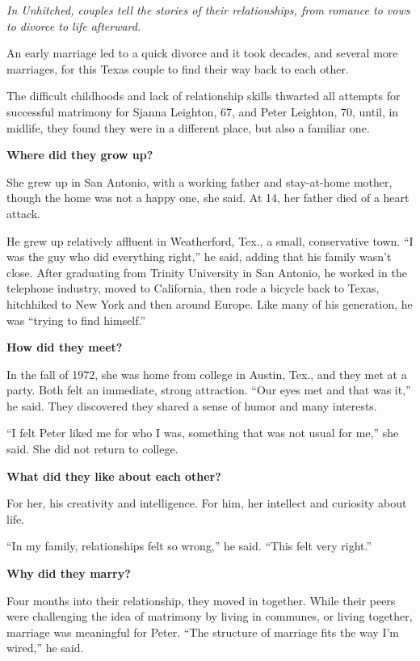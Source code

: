 \emph{In Unhitched, couples tell the stories of their relationships,
from romance to vows to divorce to life afterward.}

An early marriage led to a quick divorce and it took decades, and
several more marriages, for this Texas couple to find their way back to
each other.

The difficult childhoods and lack of relationship skills thwarted all
attempts for successful matrimony for Sjanna Leighton, 67, and Peter
Leighton, 70, until, in midlife, they found they were in a different
place, but also a familiar one.

\textbf{Where did they grow up?}

She grew up in San Antonio, with a working father and stay-at-home
mother, though the home was not a happy one, she said. At 14, her father
died of a heart attack.

He grew up relatively affluent in Weatherford, Tex., a small,
conservative town. ``I was the guy who did everything right,'' he said,
adding that his family wasn't close. After graduating from Trinity
University in San Antonio, he worked in the telephone industry, moved to
California, then rode a bicycle back to Texas, hitchhiked to New York
and then around Europe. Like many of his generation, he was ``trying to
find himself.''

\textbf{How did they meet?}

In the fall of 1972, she was home from college in Austin, Tex., and they
met at a party. Both felt an immediate, strong attraction. ``Our eyes
met and that was it,'' he said. They discovered they shared a sense of
humor and many interests.

``I felt Peter liked me for who I was, something that was not usual for
me,'' she said. She did not return to college.

\textbf{What did they like about each other?}

For her, his creativity and intelligence. For him, her intellect and
curiosity about life.

``In my family, relationships felt so wrong,'' he said. ``This felt very
right.''

\textbf{Why did they marry?}

Four months into their relationship, they moved in together. While their
peers were challenging the idea of matrimony by living in communes, or
living together, marriage was meaningful for Peter. ``The structure of
marriage fits the way I'm wired,'' he said.

